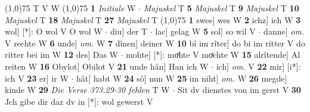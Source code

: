 \documentclass[8pt,a4paper,notitlepage]{article}
\begin{document}
\begin{table}[ht]
\begin{minipage}[t]{0.5\linewidth}
\begin{tabular}{rl}
\end{tabular}
\scriptsize
\line(1,0){75} \newline
T V W \newline
\line(1,0){75} \newline
\textbf{1} \textit{Initiale} W   $\cdot$ \textit{Majuskel} T  \textbf{5} \textit{Majuskel} T  \textbf{9} \textit{Majuskel} T  \textbf{10} \textit{Majuskel} T  \textbf{18} \textit{Majuskel} T  \textbf{27} \textit{Majuskel} T  \newline
\line(1,0){75} \newline
\textbf{1} swes] wes W \textbf{2} ichz] ich W \textbf{3} wol] [*]: O wol V O wol W  $\cdot$ diu] der T  $\cdot$ lac] gelag W \textbf{5} sol] so wil V  $\cdot$ danne] \textit{om.} V rechte W \textbf{6} unde] \textit{om.} W \textbf{7} dînen] deiner W \textbf{10} bî im rîter] do bi im ritter V do ritter bei im W \textbf{12} des] Das W  $\cdot$ mohte] [*]: moͤhte V moͤchte W \textbf{15} alrîtende] Al reiten W \textbf{16} Obylot] Obilot V \textbf{21} unde hân] Han ich W  $\cdot$ ich] \textit{om.} V \textbf{22} mir] [i*]: ich V \textbf{23} er] ir W  $\cdot$ hât] habt W \textbf{24} sô] nun W \textbf{25} im niht] \textit{om.} W \textbf{26} megde] kinde W \textbf{29} \textit{Die Verse 373.29-30 fehlen} T W   $\cdot$ Sit dv dienstes von im gerst V \textbf{30} Jch gibe dir daz dv in [*]: wol gewerst V \newline
\end{minipage}
\end{table}
\end{document}
